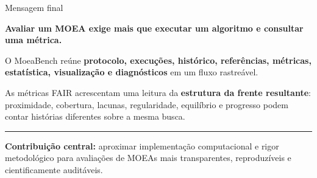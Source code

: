 \begin{frame}{Mensagem final}
\vspace{.31cm}
{\large\color{navy}\textbf{Avaliar um MOEA exige mais que executar um algoritmo e consultar uma métrica.}\par}
\vspace{.39cm}
O MoeaBench reúne \textbf{protocolo, execuções, histórico, referências, métricas, estatística, visualização e diagnósticos} em um fluxo rastreável.
\par\medskip
As métricas FAIR acrescentam uma leitura da \textbf{estrutura da frente resultante}: proximidade, cobertura, lacunas, regularidade, equilíbrio e progresso podem contar histórias diferentes sobre a mesma busca.
\vspace{.37cm}
\textcolor{navy!45}{\rule{\linewidth}{.6pt}}
\par\vspace{.19cm}
\textbf{Contribuição central:} aproximar implementação computacional e rigor metodológico para avaliações de MOEAs mais transparentes, reproduzíveis e cientificamente auditáveis.
\end{frame}
